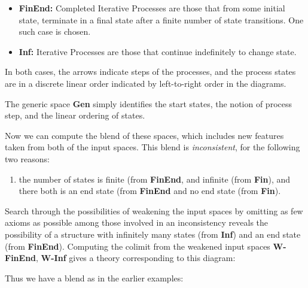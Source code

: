 
\begin{itemize}
\item  \textbf{FinEnd:} Completed Iterative Processes
are those that from some initial state, terminate in a final state
after a finite number of state transitions.  One such case is chosen.
\item 
\textbf{Inf:} Iterative Processes are those that continue indefinitely
to change state.
\end{itemize}
In both cases, the arrows indicate steps of the processes, and
the process states are in a discrete linear order indicated by left-to-right
order in the diagrams.

The generic space \textbf{Gen} simply identifies the start states, the
notion of process step, and the linear ordering of states.

Now we can compute the blend of these spaces,
which includes new features taken from both of the
input spaces.  This blend is \emph{inconsistent}, for the
following two reasons:
\begin{enumerate}
\item the number of states is finite (from \textbf{FinEnd}, and infinite
(from \textbf{Fin}), and there both is an end state (from \textbf{FinEnd}
and no end state (from \textbf{Fin}).
\end{enumerate}
Search through the possibilities of weakening the input spaces by
omitting as few axioms as possible among those involved
in an inconsistency reveals the possibility of a structure
with infinitely many states (from \textbf{Inf}) and an
end state (from \textbf{FinEnd}).  Computing the
colimit from the weakened input spaces \textbf{W-FinEnd}, \textbf{W-Inf}
gives a theory corresponding to this diagram:
\begin{center}
\end{center}
Thus we have a blend as in the earlier examples:

